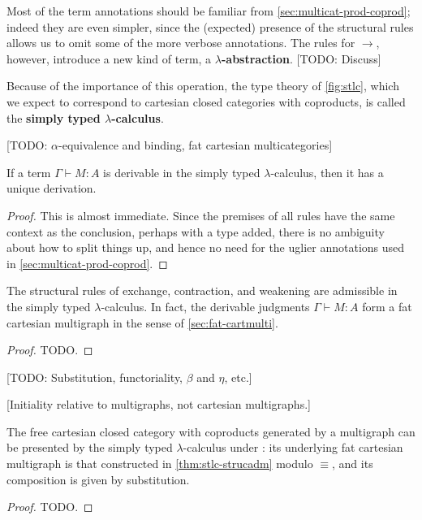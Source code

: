 \documentclass{book}
\let\types\vdash
\begin{document}
Most of the term annotations should be familiar from \cref{sec:multicat-prod-coprod}; indeed they are even simpler, since the (expected) presence of the structural rules allows us to omit some of the more verbose annotations.
The rules for $\to$, however, introduce a new kind of term, a \textbf{$\lambda$-abstraction}.
[TODO: Discuss]

Because of the importance of this operation, the type theory of \cref{fig:stlc}, which we expect to correspond to cartesian closed categories with coproducts, is called the \textbf{simply typed $\lambda$-calculus}.

[TODO: $\alpha$-equivalence and binding, fat cartesian multicategories]

\begin{lem}\label{thm:stlc-uniqderiv}
  If a term $\Gamma\types M:A$ is derivable in the simply typed $\lambda$-calculus, then it has a unique derivation.
\end{lem}
\begin{proof}
  This is almost immediate.
  Since the premises of all rules have the same context as the conclusion, perhaps with a type added, there is no ambiguity about how to split things up, and hence no need for the uglier annotations used in \cref{sec:multicat-prod-coprod}.
\end{proof}

\begin{lem}\label{thm:stlc-strucadm}
  The structural rules of exchange, contraction, and weakening are admissible in the simply typed $\lambda$-calculus.
  In fact, the derivable judgments $\Gamma\types M:A$ form a fat cartesian multigraph in the sense of \cref{sec:fat-cartmulti}.
\end{lem}
\begin{proof}
  TODO.
\end{proof}

[TODO: Substitution, functoriality, $\beta$ and $\eta$, etc.]

[Initiality relative to multigraphs, not cartesian multigraphs.]

\begin{thm}\label{thm:stlc-initial}
  The free cartesian closed category with coproducts generated by a multigraph \cG can be presented by the simply typed $\lambda$-calculus under \cG: its underlying fat cartesian multigraph is that constructed in \cref{thm:stlc-strucadm} modulo $\equiv$, and its composition is given by substitution.
\end{thm}
\begin{proof}
  TODO.
\end{proof}
\end{document}
